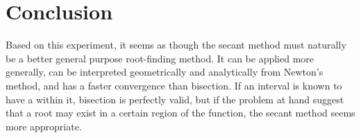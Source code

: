 \documentclass[letterpaper,10pt,titlepage]{article}
\begin{document}
\section{Conclusion}
Based on this experiment, it seems as though the secant method must naturally be
a better general purpose root-finding method. It can be applied more generally,
can be interpreted geometrically and analytically from Newton's method, and has
a faster convergence than bisection. If an interval is known to have a within
it, bisection is perfectly valid, but if the problem at hand suggest that a root
may exist in a certain region of the function, the secant method seems more
appropriate.
\end{document}

